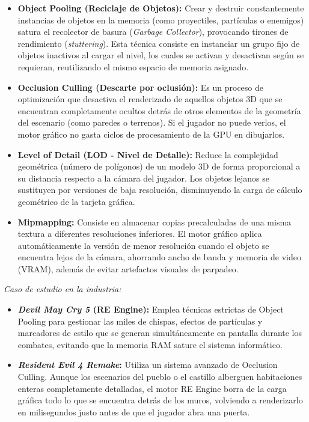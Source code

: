\documentclass[12pt]{report}
\begin{document}
\begin{itemize}
    \item \textbf{Object Pooling (Reciclaje de Objetos):} Crear y destruir constantemente instancias de objetos en la memoria (como proyectiles, partículas o enemigos) satura el recolector de basura (\textit{Garbage Collector}), provocando tirones de rendimiento (\textit{stuttering}). Esta técnica consiste en instanciar un grupo fijo de objetos inactivos al cargar el nivel, los cuales se activan y desactivan según se requieran, reutilizando el mismo espacio de memoria asignado.
    \item \textbf{Occlusion Culling (Descarte por oclusión):} Es un proceso de optimización que desactiva el renderizado de aquellos objetos 3D que se encuentran completamente ocultos detrás de otros elementos de la geometría del escenario (como paredes o terrenos). Si el jugador no puede verlos, el motor gráfico no gasta ciclos de procesamiento de la GPU en dibujarlos.
    \item \textbf{Level of Detail (LOD - Nivel de Detalle):} Reduce la complejidad geométrica (número de polígonos) de un modelo 3D de forma proporcional a su distancia respecto a la cámara del jugador. Los objetos lejanos se sustituyen por versiones de baja resolución, disminuyendo la carga de cálculo geométrico de la tarjeta gráfica.
    \item \textbf{Mipmapping:} Consiste en almacenar copias precalculadas de una misma textura a diferentes resoluciones inferiores. El motor gráfico aplica automáticamente la versión de menor resolución cuando el objeto se encuentra lejos de la cámara, ahorrando ancho de banda y memoria de video (VRAM), además de evitar artefactos visuales de parpadeo.
\end{itemize}

\textit{Caso de estudio en la industria:}
\begin{itemize}
    \item \textbf{\textit{Devil May Cry 5} (RE Engine):} Emplea técnicas estrictas de Object Pooling para gestionar las miles de chispas, efectos de partículas y marcadores de estilo que se generan simultáneamente en pantalla durante los combates, evitando que la memoria RAM sature el sistema informático.
    \item \textbf{\textit{Resident Evil 4 Remake}:} Utiliza un sistema avanzado de Occlusion Culling. Aunque los escenarios del pueblo o el castillo alberguen habitaciones enteras completamente detalladas, el motor RE Engine borra de la carga gráfica todo lo que se encuentra detrás de los muros, volviendo a renderizarlo en milisegundos justo antes de que el jugador abra una puerta.
\end{itemize}
\end{document}
